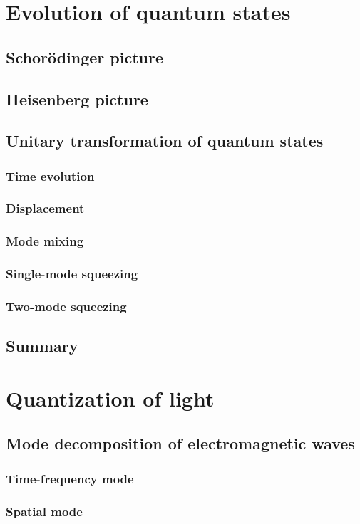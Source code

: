 \documentclass{book}
\begin{document}
\chapter{Evolution of quantum states}
\section{Schor\"odinger picture}
\section{Heisenberg picture}
\section{Unitary transformation of quantum states}
\subsection{Time evolution}
\subsection{Displacement}
\subsection{Mode mixing}
\subsection{Single-mode squeezing}
\subsection{Two-mode squeezing}
\section{Summary}

\chapter{Quantization of light}
\section{Mode decomposition of electromagnetic waves}
\subsection{Time-frequency mode}
\subsection{Spatial mode}
\end{document}
